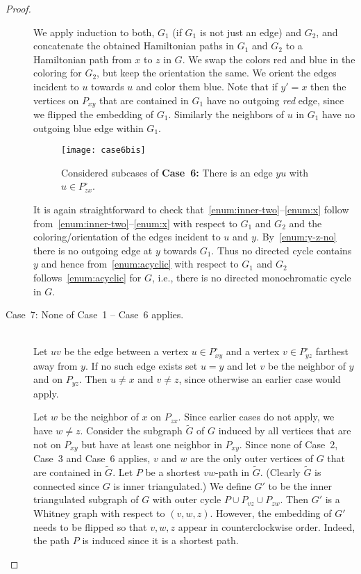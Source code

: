 \documentclass[a4paper,10pt]{article}
\theoremstyle{plain}
\newcommand{\inner}[1]{{#1}^{\circ}}
\begin{document}
\begin{proof}
\begin{description}
   We apply induction to both, $G_1$ (if $G_1$ is not just an edge) and $G_2$, and concatenate the obtained Hamiltonian paths in $G_1$ and $G_2$ to a Hamiltonian path from $x$ to $z$ in $G$. We swap the colors red and blue in the coloring for $G_2$, but keep the orientation the same. We orient the edges incident to $u$ towards $u$ and color them blue. Note that if $y'=x$ then the vertices on $P_{xy}$ that are contained in $G_1$ have no outgoing \emph{red} edge, since we flipped the embedding of $G_1$. Similarly the neighbors of $u$ in $G_1$ have no outgoing blue edge within $G_1$.
 
 
 
   \begin{figure}[tb]
    \centering
    \texttt{[image: case6bis]}
    \caption{Considered subcases of \textbf{Case~6:} There is an edge $yu$ with $u \in \inner{P}_{zx}$.}
    \label{fig:case6}
   \end{figure}
 
   It is again straightforward to check that~\ref{enum:inner-two}--\ref{enum:x} follow from~\ref{enum:inner-two}--\ref{enum:x} with respect to $G_1$ and $G_2$ and the coloring/orientation of the edges incident to $u$ and $y$. By~\ref{enum:y-z-no} there is no outgoing edge at $y$ towards $G_1$. Thus no directed cycle contains $y$ and hence from~\ref{enum:acyclic} with respect to $G_1$ and $G_2$ follows~\ref{enum:acyclic} for $G$, i.e., there is no directed monochromatic cycle in $G$.
   
  \item[Case~7: None of Case~1 -- Case~6 applies.]{\ \\}
   Let $uv$ be the edge between a vertex $u\in\inner{P}_{xy}$ and a vertex $v\in\inner{P}_{yz}$ farthest away from $y$. If no such edge exists set $u=y$ and let $v$ be the neighbor of $y$ and on $P_{yz}$. Then $u \neq x$ and $v \neq z$, since otherwise an earlier case would apply.
 
   Let $w$ be the neighbor of $x$ on $P_{zx}$. Since earlier cases do not apply, we have $w \neq z$. Consider the subgraph $\tilde{G}$ of $G$ induced by all vertices that are not on $P_{xy}$ but have at least one neighbor in $P_{xy}$. Since none of Case~2, Case~3 and Case~6 applies, $v$ and $w$ are the only outer vertices of $G$ that are contained in $\tilde{G}$. Let $P$ be a shortest $vw$-path in $\tilde{G}$. (Clearly $\tilde{G}$ is connected since $G$ is inner triangulated.) We define $G'$ to be the inner triangulated subgraph of $G$ with outer cycle $P \cup P_{vz} \cup P_{zw}$. Then $G'$ is a Whitney graph with respect to $(v,w,z)$. However, the embedding of $G'$ needs to be flipped so that $v,w,z$ appear in counterclockwise order. Indeed, the path $P$ is induced since it is a shortest path.


\end{description}
\end{proof}
\end{document}
